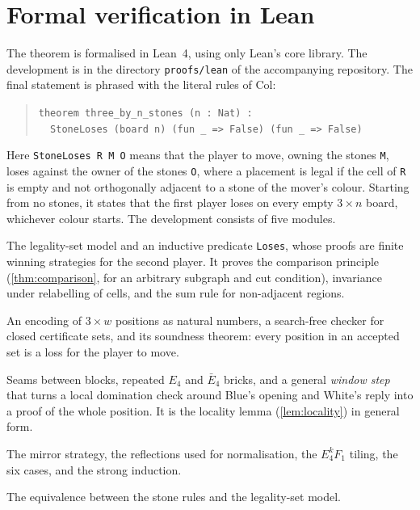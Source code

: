 \documentclass[11pt]{amsart}
\theoremstyle{definition}
\begin{document}
\section{Formal verification in Lean}\label{sec:lean}

The theorem is formalised in Lean~4, using only Lean's core library. The
development is in the directory \texttt{proofs/lean} of the accompanying
repository. The final
statement is phrased with the literal rules of Col:
\begin{quote}\small
\texttt{theorem three\_by\_n\_stones (n : Nat) :}\\
\texttt{\ \ StoneLoses (board n) (fun \_ => False) (fun \_ => False)}
\end{quote}
Here \texttt{StoneLoses R M O} means that the player to move, owning the
stones \texttt{M}, loses against the owner of the stones \texttt{O}, where a
placement is legal if the cell of \texttt{R} is empty and not orthogonally
adjacent to a stone of the mover's colour. Starting from no stones, it states
that the first player loses on every empty $3\times n$ board, whichever colour
starts. The development consists of five modules.

\begin{description}[font=\normalfont\ttfamily, leftmargin=1.5em, style=nextline]
\item[Game] The legality-set model and an inductive predicate
\texttt{Loses}, whose proofs are finite winning strategies for the second
player. It proves the comparison principle (\cref{thm:comparison}, for an
arbitrary subgraph and cut condition), invariance under relabelling of cells,
and the sum rule for non-adjacent regions.
\item[Cert] An encoding of $3\times w$ positions as natural numbers, a
search-free checker for closed certificate sets, and its soundness theorem:
every position in an accepted set is a loss for the player to move.
\item[Blocks] Seams between blocks, repeated $E_4$ and $\bar E_4$ bricks, and
a general \emph{window step} that turns a local domination check around
Blue's opening and White's reply into a proof of the whole position. It is the
locality lemma (\cref{lem:locality}) in general form.
\item[Main] The mirror strategy, the reflections used for normalisation, the
$E_4^kF_1$ tiling, the six cases, and the strong induction.
\item[Stones] The equivalence between the stone rules and the legality-set
model.
\end{description}
\end{document}
